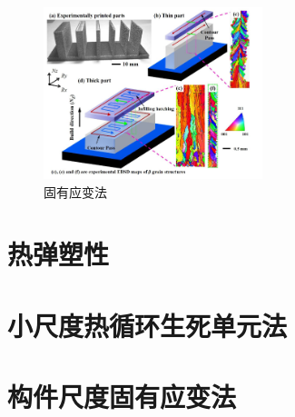 \begin{figure}[!htbp]
  \centering
  \includegraphics[height=5cm]{fig/4/6.png}
  \caption{固有应变法}
  \label{fig:4-6}
\end{figure}

\section{热弹塑性}

\section{小尺度热循环生死单元法}

\section{构件尺度固有应变法}
